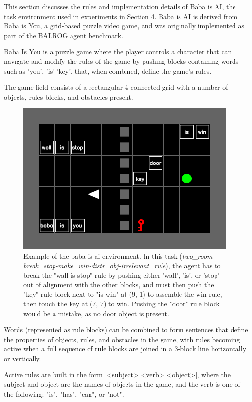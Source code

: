 This section discusses the rules and implementation details of Baba is AI, the task environment used in experiments in Section 4. Baba is AI is derived from Baba is You, a grid-based puzzle video game, and was originally implemented as part of the BALROG \cite{paglieri2024balrog} agent benchmark.

Baba Is You is a puzzle game where the player controls a character that can navigate and modify the rules of the game by pushing blocks containing words such as 'you', 'is' 'key', that, when combined, define the game's rules. 

The game field consists of a rectangular 4-connected grid with a number of objects, rules blocks, and obstacles present.

\begin{figure}[ht]
    \centering
    \includegraphics[scale=0.75]{figs/babaisai_env.png}
    \caption{Example of the baba-is-ai environment. In this task (\textit{two\_room-break\_stop-make\_win-distr\_obj-irrelevant\_rule}), the agent has to break the "wall is stop" rule by pushing either 'wall', 'is', or 'stop' out of alignment with the other blocks, and must then push the "key" rule block next to "is win" at (9, 1) to assemble the win rule, then touch the key at (7, 7) to win. Pushing the "door" rule block would be a mistake, as no door object is present.}
    \label{fig:babaisai_env}
\end{figure}

Words (represented as rule blocks) can be combined to form sentences that define the properties of objects, rules, and obstacles in the game, with rules becoming active when a full sequence of rule blocks are joined in a 3-block line horizontally or vertically.

Active rules are built in the form [<subject> <verb> <object>], where the subject and object are the names of objects in the game, and the verb is one of the following: "is", "has", "can", or "not".

